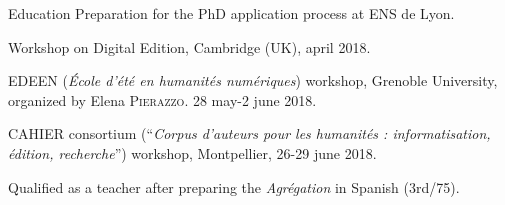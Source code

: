 \begin{rubric}{Education}
                                \entry*[2017-2018]
                            Preparation for the PhD application process at ENS
                        de Lyon.
                    
                                \entry*
                            Workshop on Digital Edition, Cambridge (UK), april
                        2018.
                    
                                 EDEEN (\textit{École d'été en humanités
                            numériques}) workshop, Grenoble University,
                        organized by Elena \textsc{Pierazzo}. 28
                        may-2 june 2018.
                    
                                 CAHIER consortium (\enquote{\textit{Corpus d’auteurs
                                pour les humanités : informatisation, édition,
                                recherche}}) workshop, Montpellier,
                        26-29 june 2018.
                    
                                \entry*[2016-2017]
                            Qualified as a teacher after preparing the
                            \textit{Agrégation} in Spanish (3rd/75).
                    

\end{rubric}
